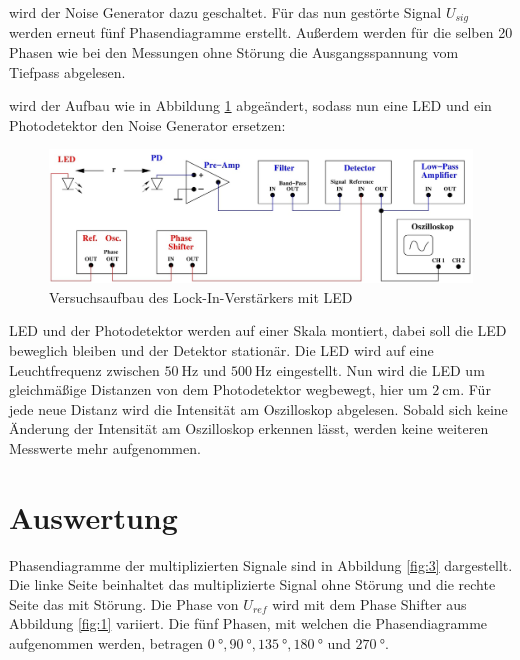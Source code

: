\justifying wird der Noise Generator dazu geschaltet. Für das nun gestörte Signal $U_{sig}$ werden erneut fünf Phasendiagramme
erstellt. Außerdem werden für die selben 20 Phasen wie bei den Messungen ohne Störung die Ausgangsspannung vom Tiefpass abgelesen. 

\justifying wird der Aufbau wie in Abbildung \ref{fig:2} abgeändert, sodass nun eine LED und ein Photodetektor den 
Noise Generator ersetzen:

\begin{figure}[H]
    \centering
    \includegraphics[width=\linewidth]{./images/lock-in_led.jpg}
    \caption{Versuchsaufbau des Lock-In-Verstärkers mit LED \cite{V303}}
    \label{fig:2}
\end{figure}

\justifying LED  und der Photodetektor werden auf einer Skala montiert, dabei soll die LED beweglich bleiben und der Detektor stationär.
Die LED wird auf eine Leuchtfrequenz zwischen $\SI{50}{\hertz}$ und $\SI{500}{\hertz}$ eingestellt. Nun wird die LED um gleichmäßige Distanzen
von dem Photodetektor wegbewegt, hier um $\SI{2}{\centi\meter}$. Für jede neue Distanz wird die Intensität am Oszilloskop abgelesen. Sobald sich keine
Änderung der Intensität am Oszilloskop erkennen lässt, werden keine weiteren Messwerte mehr aufgenommen.  


\section{Auswertung} \label{sec:5}

\justifying Phasendiagramme der multiplizierten Signale sind in Abbildung \ref{fig:3} dargestellt. Die linke Seite beinhaltet
das multiplizierte Signal ohne Störung und die rechte Seite das mit Störung. Die Phase von $U_{ref}$ wird mit dem Phase Shifter aus Abbildung 
\ref{fig:1} variiert. Die fünf Phasen, mit welchen die Phasendiagramme aufgenommen werden, betragen $\SI{0}{\degree}, \SI{90}{\degree}, 
\SI{135}{\degree}, \SI{180}{\degree}$ und $\SI{270}{\degree}$.
\newpage

